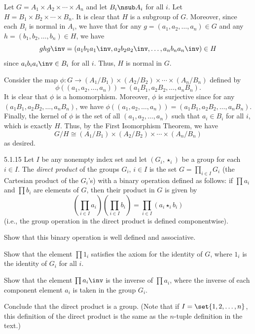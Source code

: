 \begin{sol}
    Let $G = A_1 \times A_2 \times \cdots \times A_n$ and let $B_i \nsub A_i$ for all $i$.
	Let $H = B_1 \times B_2 \times \cdots \times B_n$.
	It is clear that $H$ is a subgroup of $G$.
	Moreover, since each $B_i$ is normal in $A_i$, we have that for any $g = (a_1, a_2, \ldots, a_n) \in G$ and any $h = (b_1, b_2, \ldots, b_n) \in H$, we have
    \[
    	ghg\inv = (a_1b_1a_1\inv, a_2b_2a_2\inv, \ldots, a_nb_na_n\inv) \in H
    \]
    since $a_ib_ia_i\inv \in B_i$ for all $i$.
	Thus, $H$ is normal in $G$.

    Consider the map $\phi \colon G \to (A_1/B_1) \times (A_2/B_2) \times \cdots \times (A_n/B_n)$ defined by
    \[
    	\phi((a_1, a_2, \ldots, a_n)) = (a_1B_1, a_2B_2, \ldots, a_nB_n).
    \]
    It is clear that $\phi$ is a homomorphism.
	Moreover, $\phi$ is surjective since for any $(a_1B_1, a_2B_2, \ldots, a_nB_n)$, we have $\phi((a_1, a_2, \ldots, a_n)) = (a_1B_1, a_2B_2, \ldots, a_nB_n)$.
	Finally, the kernel of $\phi$ is the set of all $(a_1, a_2, \ldots, a_n)$ such that $a_i \in B_i$ for all $i$, which is exactly $H$.
	Thus, by the First Isomorphism Theorem, we have
    \[
    	G/H \cong (A_1/B_1) \times (A_2/B_2) \times \cdots \times (A_n/B_n)
    \]
    as desired.
\end{sol}

\begin{exercise}{5.1.15}
    Let $I$ be any nonempty index set and let $(G_i, \star_i)$ be a group for each $i \in I$.
	The \emph{direct product} of the groups $G_i$, $i \in I$ is the set $G = \prod_{i \in I} G_i$ (the Cartesian product of the $G_i$'s) with a binary operation defined as follows: if $\prod a_i$ and $\prod b_i$ are elements of $G$, then their product in $G$ is given by
    \[
    	\left(\prod_{i \in I} a_i\right)\left(\prod_{i \in I} b_i\right) = \prod_{i \in I} (a_i \star_i b_i)
    \]
    (i.e., the group operation in the direct product is defined componentwise).
    \begin{subexercises}
        \item Show that this binary operation is well defined and associative.
        \item Show that the element $\prod 1_i$ satisfies the axiom for the identity of $G$, where $1_i$ is the identity of $G_i$ for all $i$.
        \item Show that the element $\prod a_i\inv$ is the inverse of $\prod a_i$, where the inverse of each component element $a_i$ is taken in the group $G_i$.
    \end{subexercises}
    Conclude that the direct product is a group. (Note that if $I = \set{1, 2, \ldots, n}$, this definition of the direct product is the same as the $n$-tuple definition in the text.)
\end{exercise}


